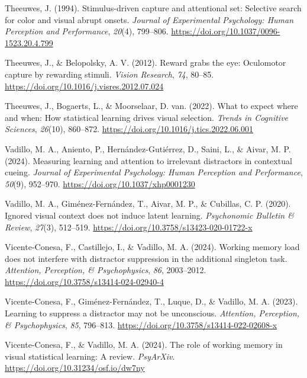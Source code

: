 \documentclass[
  man,
  floatsintext,
  longtable,
  nolmodern,
  notxfonts,
  notimes,
  mask,
  colorlinks=true,linkcolor=blue,citecolor=blue,urlcolor=blue]{apa7}
\newlength{\cslhangindent}
\newenvironment{CSLReferences}[2] %
 {\begin{list}{}{%
  \setlength{\itemindent}{0pt}
  \setlength{\leftmargin}{0pt}
  \setlength{\parsep}{0pt}
  \ifodd #1
   \setlength{\leftmargin}{\cslhangindent}
   \setlength{\itemindent}{-1\cslhangindent}
  \fi
  \setlength{\itemsep}{#2\baselineskip}}}
 {\end{list}}
\begin{document}
\begin{CSLReferences}{1}{0}
Theeuwes, J. (1994). Stimulus-driven capture and attentional set:
Selective search for color and visual abrupt onsets. \emph{Journal of
Experimental Psychology: Human Perception and Performance},
\emph{20}(4), 799--806. \url{https://doi.org/10.1037/0096-1523.20.4.799}

Theeuwes, J., \& Belopolsky, A. V. (2012). Reward grabs the eye:
Oculomotor capture by rewarding stimuli. \emph{Vision Research},
\emph{74}, 80--85. \url{https://doi.org/10.1016/j.visres.2012.07.024}

Theeuwes, J., Bogaerts, L., \& Moorselaar, D. van. (2022). What to
expect where and when: How statistical learning drives visual selection.
\emph{Trends in Cognitive Sciences}, \emph{26}(10), 860--872.
\url{https://doi.org/10.1016/j.tics.2022.06.001}

Vadillo, M. A., Aniento, P., Hernández-Gutiérrez, D., Saini, L., \&
Aivar, M. P. (2024). Measuring learning and attention to irrelevant
distractors in contextual cueing. \emph{Journal of Experimental
Psychology: Human Perception and Performance}, \emph{50}(9), 952--970.
\url{https://doi.org/10.1037/xhp0001230}

Vadillo, M. A., Giménez-Fernández, T., Aivar, M. P., \& Cubillas, C. P.
(2020). Ignored visual context does not induce latent learning.
\emph{Psychonomic Bulletin \& Review}, \emph{27}(3), 512--519.
\url{https://doi.org/10.3758/s13423-020-01722-x}

Vicente-Conesa, F., Castillejo, I., \& Vadillo, M. A. (2024). Working
memory load does not interfere with distractor suppression in the
additional singleton task. \emph{Attention, Perception, \&
Psychophysics}, \emph{86}, 2003--2012.
\url{https://doi.org/10.3758/s13414-024-02940-4}

Vicente-Conesa, F., Giménez-Fernández, T., Luque, D., \& Vadillo, M. A.
(2023). Learning to suppress a distractor may not be unconscious.
\emph{Attention, Perception, \& Psychophysics}, \emph{85}, 796--813.
\url{https://doi.org/10.3758/s13414-022-02608-x}

Vicente-Conesa, F., \& Vadillo, M. A. (2024). The role of working memory
in visual statistical learning: A review. \emph{PsyArXiv}.
\url{https://doi.org/10.31234/osf.io/dw7ny}


\end{CSLReferences}
\end{document}
